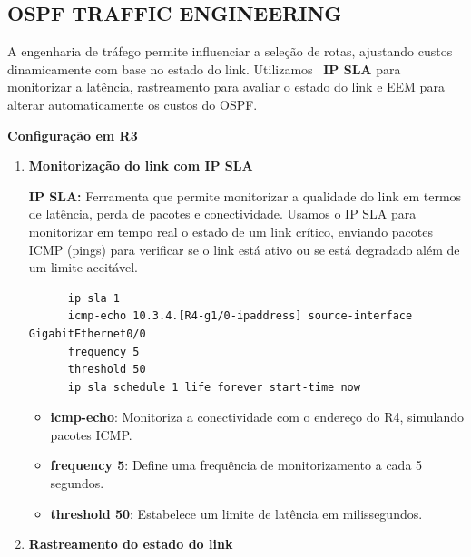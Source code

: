 \documentclass[11pt,english, openright, oneside]{book}
\begin{document}
\pagebreak
\subsection{OSPF TRAFFIC ENGINEERING}
\vspace{0.2cm}

A engenharia de tráfego permite influenciar a seleção de rotas, ajustando custos dinamicamente com base no estado do link. Utilizamos ~\textbf{IP SLA} para monitorizar a latência, rastreamento para avaliar o estado do link e EEM para alterar automaticamente os custos do OSPF. \par \vspace{0.1cm}

\vspace{0.8cm}
\textbf{Configuração em R3}
\begin{enumerate}
  \item \textbf{Monitorização do link com IP SLA} \par \vspace{0.2cm}

    \textbf{IP SLA:} Ferramenta que permite monitorizar a qualidade do link em termos de latência, perda de pacotes e conectividade. Usamos o IP SLA para monitorizar em tempo real o estado de um link crítico, enviando pacotes ICMP (pings) para verificar se o link está ativo ou se está degradado além de um limite aceitável.

    \begin{verbatim}
      ip sla 1
      icmp-echo 10.3.4.[R4-g1/0-ipaddress] source-interface GigabitEthernet0/0
      frequency 5
      threshold 50
      ip sla schedule 1 life forever start-time now
    \end{verbatim}

    \begin{itemize}
      \item \textbf{icmp-echo}: Monitoriza a conectividade com o endereço do R4, simulando pacotes ICMP.
      \item \textbf{frequency 5}: Define uma frequência de monitorizamento a cada 5 segundos.
      \item \textbf{threshold 50}: Estabelece um limite de latência em milissegundos.
    \end{itemize}

    \vspace{0.4cm}
  \item \textbf{Rastreamento do estado do link} \par


\end{enumerate}
\end{document}
